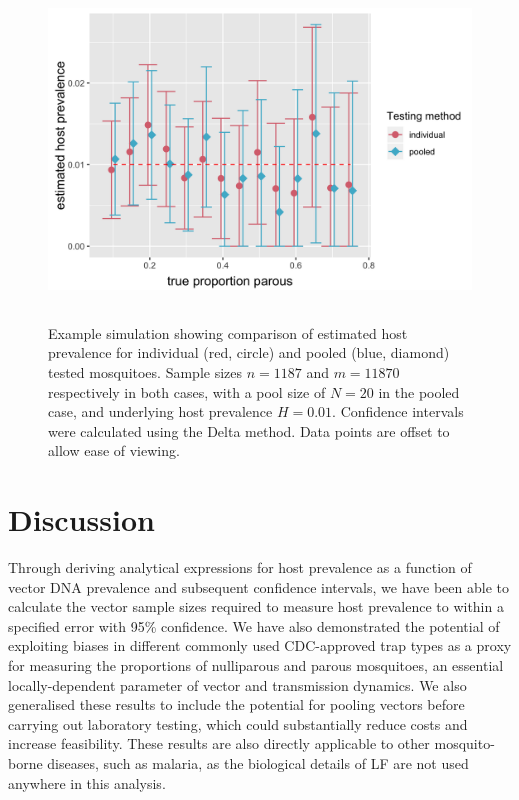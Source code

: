 \begin{figure}[ht]
\begin{center}
\includegraphics[height=9cm]{Project/Figures/Xeno/HPrevEst.png}
\end{center}
\caption[Estimated host prevalence (individual and pooled testing).]{Example simulation showing comparison of estimated host prevalence for individual (red, circle) and pooled (blue, diamond) tested mosquitoes. Sample sizes $n=1187$ and $m=11870$ respectively in both cases, with a pool size of $N=20$ in the pooled case, and underlying host prevalence $H=0.01$. Confidence intervals were calculated using the Delta method. Data points are offset to allow ease of viewing.}
\label{fig:hPrev}
\end{figure}

\FloatBarrier

\section{Discussion}

Through deriving analytical expressions for host prevalence as a function of vector DNA prevalence and subsequent confidence intervals, we have been able to calculate the vector sample sizes required to measure host prevalence to within a specified error with 95\% confidence. We have also demonstrated the potential of exploiting biases in different commonly used CDC-approved trap types as a proxy for measuring the proportions of nulliparous and parous mosquitoes, an essential locally-dependent parameter of vector and transmission dynamics. We also generalised these results to include the potential for pooling vectors before carrying out laboratory testing, which could substantially reduce costs and increase feasibility. These results are also directly applicable to other mosquito-borne diseases, such as malaria, as the biological details of LF are not used anywhere in this analysis.

